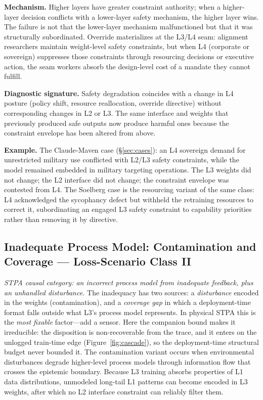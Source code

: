 \documentclass[11pt]{article}
\begin{document}
\textbf{Mechanism.} Higher layers have greater constraint authority; when a higher-layer decision conflicts with a lower-layer safety mechanism, the higher layer wins. The failure is not that the lower-layer mechanism malfunctioned but that it was structurally subordinated. Override materializes at the L3/L4 seam: alignment researchers maintain weight-level safety constraints, but when L4 (corporate or sovereign) suppresses those constraints through resourcing decisions or executive action, the seam workers absorb the design-level cost of a mandate they cannot fulfill.

\textbf{Diagnostic signature.} Safety degradation coincides with a change in L4 posture (policy shift, resource reallocation, override directive) without corresponding changes in L2 or L3. The same interface and weights that previously produced safe outputs now produce harmful ones because the constraint envelope has been altered from above.

\textbf{Example.} The Claude-Maven case (\S\ref{sec:cases}): an L4 sovereign demand for unrestricted military use conflicted with L2/L3 safety constraints, while the model remained embedded in military targeting operations. The L3 weights did not change; the L2 interface did not change; the constraint envelope was contested from L4. The Soelberg case is the resourcing variant of the same class: L4 acknowledged the sycophancy defect but withheld the retraining resources to correct it, subordinating an engaged L3 safety constraint to capability priorities rather than removing it by directive.

\subsection{Inadequate Process Model: Contamination and Coverage --- Loss-Scenario Class II}

\emph{STPA causal category: an incorrect process model from inadequate feedback, plus an unhandled disturbance.} The inadequacy has two sources: a \emph{disturbance} encoded in the weights (contamination), and a \emph{coverage gap} in which a deployment-time format falls outside what L3's process model represents. In physical STPA this is the \emph{most fixable} factor---add a sensor. Here the companion bound makes it irreducible: the disposition is non-recoverable from the trace, and it enters on the unlogged train-time edge (Figure~\ref{fig:cascade}), so the deployment-time structural budget never bounded it. The contamination variant occurs when environmental disturbances degrade higher-level process models through information flow that crosses the epistemic boundary. Because L3 training absorbs properties of L1 data distributions, unmodeled long-tail L1 patterns can become encoded in L3 weights, after which no L2 interface constraint can reliably filter them.
\end{document}
